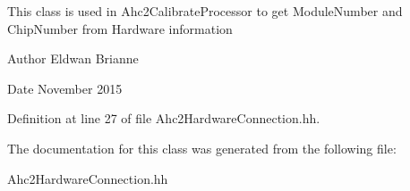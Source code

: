 This class is used in Ahc2CalibrateProcessor to get ModuleNumber and ChipNumber from Hardware information

\begin{DoxyAuthor}{Author}
Eldwan Brianne 
\end{DoxyAuthor}
\begin{DoxyDate}{Date}
November 2015 
\end{DoxyDate}


Definition at line 27 of file Ahc2HardwareConnection.hh.

The documentation for this class was generated from the following file:\begin{DoxyCompactItemize}
\item 
Ahc2HardwareConnection.hh\end{DoxyCompactItemize}
